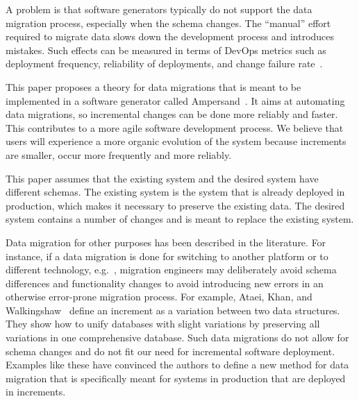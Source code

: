 \documentclass[runningheads]{llncs}
\begin{document}
   A problem is that software generators typically do not support the data migration process, especially when the schema changes.
   The ``manual'' effort required to migrate data slows down the development process and introduces mistakes.
   Such effects can be measured in terms of DevOps metrics such as deployment frequency, reliability of deployments, and change failure rate~\cite{DevOps2021}.

   This paper proposes a theory for data migrations that is meant to be implemented in a software generator called Ampersand~\cite{JoostenRAMiCS2017,Joosten-JLAMP2018}.
   It aims at automating data migrations, so incremental changes can be done more reliably and faster.
   This contributes to a more agile software development process.
   We believe that users will experience a more organic evolution of the system because increments are smaller, occur more frequently and more reliably.
   
   This paper assumes that the existing system and the desired system have different schemas.
   The existing system is the system that is already deployed in production,
   which makes it necessary to preserve the existing data.
   The desired system contains a number of changes and is meant to replace the existing system.

   Data migration for other purposes has been described in the literature.
   For instance, if a data migration is done for switching to another platform or to different technology,
   e.g.~\cite{Gholami2016,Bisbal1999},
   migration engineers may deliberately avoid schema differences and functionality changes to avoid introducing new errors in an otherwise error-prone migration process.
   For example, Ataei, Khan, and Walkingshaw~\cite{Ataei2021,Walkingshaw2014} define an increment as a variation between two data structures.
   They show how to unify databases with slight variations by preserving all variations in one comprehensive database.
   Such data migrations do not allow for schema changes and do not fit our need for incremental software deployment.
   Examples like these have convinced the authors to define a new method for data migration that is specifically meant for systems in production that are
   deployed in increments.
   
\end{document}

